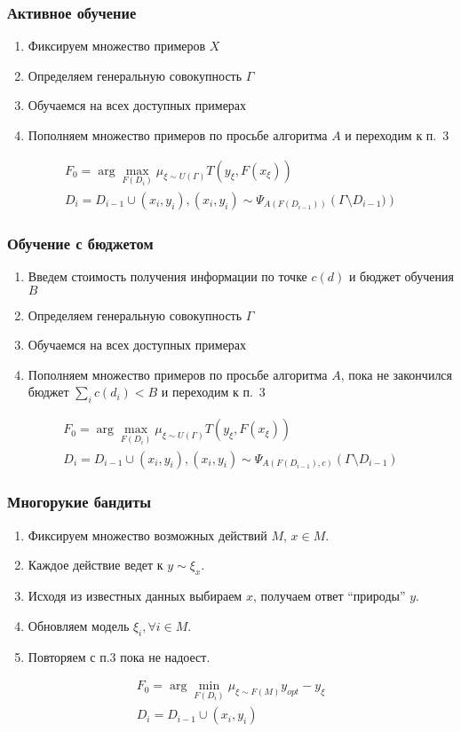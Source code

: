 \documentclass[14pt, fleqn, xcolor={dvipsnames, table}]{beamer}
\begin{document}
\begin{frame}
\frametitle{Активное обучение}
\begin{enumerate}
	\item Фиксируем множество примеров $X$
	\item Определяем генеральную совокупность $\Gamma$
	\item Обучаемся на всех доступных примерах
	\item Пополняем множество примеров по просьбе алгоритма $A$ и переходим к п.~3
\end{enumerate}
$$\begin{array}{l}
F_0 = \arg \max_{F(D_i)} \mu_{\xi \sim U\left(\Gamma\right)}T(y_{\xi}, F(x_{\xi})) \\
D_i = D_{i-1} \cup (x_i, y_i), (x_i, y_i) \sim \Psi_{A(F(D_{i-1}))}\left(\Gamma \setminus D_{i-1})\right)
\end{array}$$
\end{frame}

\begin{frame}
\frametitle{Обучение с бюджетом}
\begin{enumerate}
	\item Введем стоимость получения информации по точке $c(d)$ и бюджет обучения $B$
	\item Определяем генеральную совокупность $\Gamma$
	\item Обучаемся на всех доступных примерах
	\item Пополняем множество примеров по просьбе алгоритма $A$, пока не закончился бюджет $\sum_i c(d_i) < B$ и переходим к п.~3
\end{enumerate}
$$\begin{array}{l}
F_0 = \arg \max_{F(D_i)} \mu_{\xi \sim U\left(\Gamma\right)}T(y_{\xi}, F(x_{\xi})) \\
D_i = D_{i-1} \cup (x_i, y_i), (x_i, y_i) \sim \Psi_{A(F(D_{i-1}),c)}\left(\Gamma \setminus D_{i-1}\right)
\end{array}$$
\end{frame}

\begin{frame}
\frametitle{Многорукие бандиты}
\begin{enumerate}
	\item Фиксируем множество возможных действий $M$, $x\in M$.
	\item Каждое действие ведет к $y \sim \xi_x$.
	\item Исходя из известных данных выбираем $x$, получаем ответ ``природы'' $y$.
	\item Обновляем модель $\xi_i, \forall i \in M$.
	\item Повторяем с п.3 пока не надоест.
\end{enumerate}
$$\begin{array}{l}
F_0 = \arg \min_{F(D_i)} \mu_{\xi \sim F\left(M\right)} y_{opt} - y_{\xi} \\
D_i = D_{i-1} \cup (x_i, y_i)
\end{array}$$
\end{frame}
\end{document}
